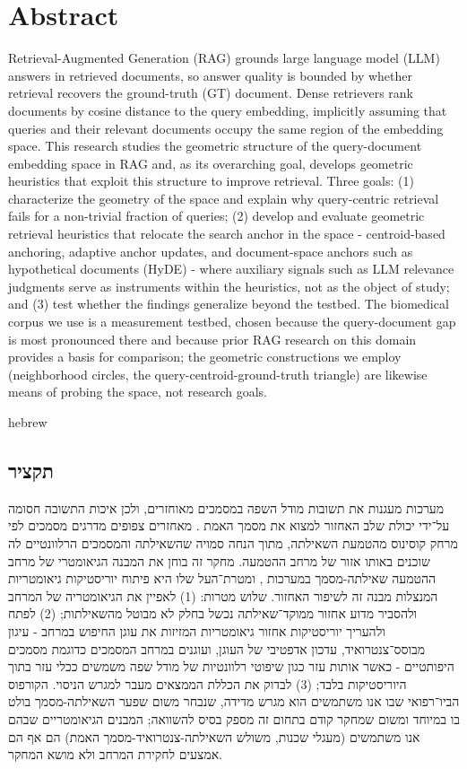 \documentclass[11pt,a4paper]{article}
\begin{document}
\section*{Abstract}

Retrieval-Augmented Generation (RAG) grounds large language model (LLM) answers in retrieved documents, so answer quality is bounded by whether retrieval recovers the ground-truth (GT) document. Dense retrievers rank documents by cosine distance to the query embedding, implicitly assuming that queries and their relevant documents occupy the same region of the embedding space. This research studies the geometric structure of the query-document embedding space in RAG and, as its overarching goal, develops geometric heuristics that exploit this structure to improve retrieval. Three goals: (1) characterize the geometry of the space and explain why query-centric retrieval fails for a non-trivial fraction of queries; (2) develop and evaluate geometric retrieval heuristics that relocate the search anchor in the space - centroid-based anchoring, adaptive anchor updates, and document-space anchors such as hypothetical documents (HyDE) - where auxiliary signals such as LLM relevance judgments serve as instruments within the heuristics, not as the object of study; and (3) test whether the findings generalize beyond the testbed. The biomedical corpus we use is a measurement testbed, chosen because the query-document gap is most pronounced there and because prior RAG research on this domain provides a basis for comparison; the geometric constructions we employ (neighborhood circles, the query-centroid-ground-truth triangle) are likewise means of probing the space, not research goals.

\begin{otherlanguage*}{hebrew}
\subsection*{\texthebrew{תקציר}}
מערכות \textenglish{} מעגנות את תשובות מודל השפה במסמכים מאוחזרים, ולכן איכות התשובה חסומה על־ידי יכולת שלב האחזור למצוא את מסמך האמת \textenglish{}. מאחזרים צפופים מדרגים מסמכים לפי מרחק קוסינוס מהטמעת השאילתה, מתוך הנחה סמויה שהשאילתה והמסמכים הרלוונטיים לה שוכנים באותו אזור של מרחב ההטמעה. מחקר זה בוחן את המבנה הגיאומטרי של מרחב ההטמעה שאילתה-מסמך במערכות \textenglish{}, ומטרת־העל שלו היא פיתוח יוריסטיקות גיאומטריות המנצלות מבנה זה לשיפור האחזור. שלוש מטרות: (1) לאפיין את הגיאומטריה של המרחב ולהסביר מדוע אחזור ממוקד־שאילתה נכשל בחלק לא מבוטל מהשאילתות; (2) לפתח ולהעריך יוריסטיקות אחזור גיאומטריות המזיזות את עוגן החיפוש במרחב - עיגון מבוסס־צנטרואיד, עדכון אדפטיבי של העוגן, ועוגנים במרחב המסמכים כדוגמת מסמכים היפותטיים \textenglish{} - כאשר אותות עזר כגון שיפוטי רלוונטיות של מודל שפה משמשים ככלי עזר בתוך היוריסטיקות בלבד; (3) לבדוק את הכללת הממצאים מעבר למגרש הניסוי. הקורפוס הביו־רפואי שבו אנו משתמשים הוא מגרש מדידה, שנבחר משום שפער השאילתה-מסמך בולט בו במיוחד ומשום שמחקר \textenglish{} קודם בתחום זה מספק בסיס להשוואה; המבנים הגיאומטריים שבהם אנו משתמשים (מעגלי שכנות, משולש השאילתה-צנטרואיד-מסמך האמת) הם אף הם אמצעים לחקירת המרחב ולא מושא המחקר.
\end{otherlanguage*}
\end{document}
